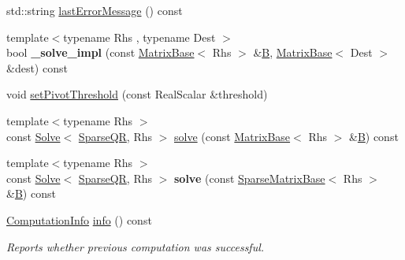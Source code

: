 \begin{DoxyCompactItemize}
\item 
std\+::string \hyperlink{group___sparse_q_r___module_a1222e59649d77125d91f1368cf293c63}{last\+Error\+Message} () const
\item 
\mbox{\label{group___sparse_q_r___module_ad8a931d66ec8b8b6d383752f142242ad}} 
{\footnotesize template$<$typename Rhs , typename Dest $>$ }\\bool {\bfseries \+\_\+solve\+\_\+impl} (const \hyperlink{group___core___module_class_eigen_1_1_matrix_base}{Matrix\+Base}$<$ Rhs $>$ \&\hyperlink{group___core___module_class_eigen_1_1_matrix}{B}, \hyperlink{group___core___module_class_eigen_1_1_matrix_base}{Matrix\+Base}$<$ Dest $>$ \&dest) const
\item 
void \hyperlink{group___sparse_q_r___module_adb7bfa65f99e3ef91ed58ea663a850a1}{set\+Pivot\+Threshold} (const Real\+Scalar \&threshold)
\item 
{\footnotesize template$<$typename Rhs $>$ }\\const \hyperlink{group___core___module_class_eigen_1_1_solve}{Solve}$<$ \hyperlink{group___sparse_q_r___module_class_eigen_1_1_sparse_q_r}{Sparse\+QR}, Rhs $>$ \hyperlink{group___sparse_q_r___module_aea13a2c6823cd8408ba49afde9b3d4e4}{solve} (const \hyperlink{group___core___module_class_eigen_1_1_matrix_base}{Matrix\+Base}$<$ Rhs $>$ \&\hyperlink{group___core___module_class_eigen_1_1_matrix}{B}) const
\item 
\mbox{\label{group___sparse_q_r___module_a8a0a30096cfe15383f2a3cd5ba6cb5a4}} 
{\footnotesize template$<$typename Rhs $>$ }\\const \hyperlink{group___core___module_class_eigen_1_1_solve}{Solve}$<$ \hyperlink{group___sparse_q_r___module_class_eigen_1_1_sparse_q_r}{Sparse\+QR}, Rhs $>$ {\bfseries solve} (const \hyperlink{group___sparse_core___module_class_eigen_1_1_sparse_matrix_base}{Sparse\+Matrix\+Base}$<$ Rhs $>$ \&\hyperlink{group___core___module_class_eigen_1_1_matrix}{B}) const
\item 
\hyperlink{group__enums_ga85fad7b87587764e5cf6b513a9e0ee5e}{Computation\+Info} \hyperlink{group___sparse_q_r___module_a234b0580aaf57237393f2e73a3d38690}{info} () const
\begin{DoxyCompactList}\small\item\em Reports whether previous computation was successful. \end{DoxyCompactList}\item 

\end{DoxyCompactItemize}
